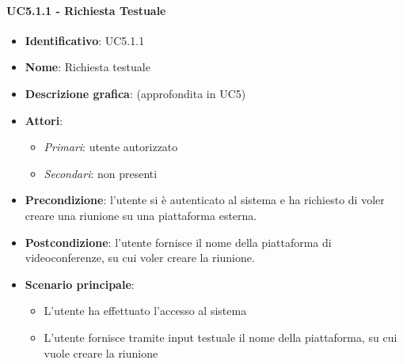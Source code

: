 \paragraph{UC5.1.1 - Richiesta Testuale}
\begin{itemize}
   \item \textbf{Identificativo}: UC5.1.1
   \item \textbf{Nome}: Richiesta testuale
   \item \textbf{Descrizione grafica}: (approfondita in UC5)
   \item \textbf{Attori}:
   \begin{itemize} 
       \item \textit{Primari}: utente autorizzato
       \item \textit{Secondari}: non presenti
   \end{itemize}
       \item \textbf{Precondizione}: l'utente si è autenticato al sistema e ha richiesto di voler creare una riunione su una piattaforma esterna.
       \item \textbf{Postcondizione}: l'utente fornisce il nome della piattaforma di videoconferenze, su cui voler creare la riunione.
    \item \textbf{Scenario principale}: 
       \begin{itemize}
           \item L'utente ha effettuato l'accesso al sistema 
           \item L'utente fornisce tramite input testuale il nome della piattaforma, su cui vuole creare la riunione
       \end{itemize}
\end{itemize}

